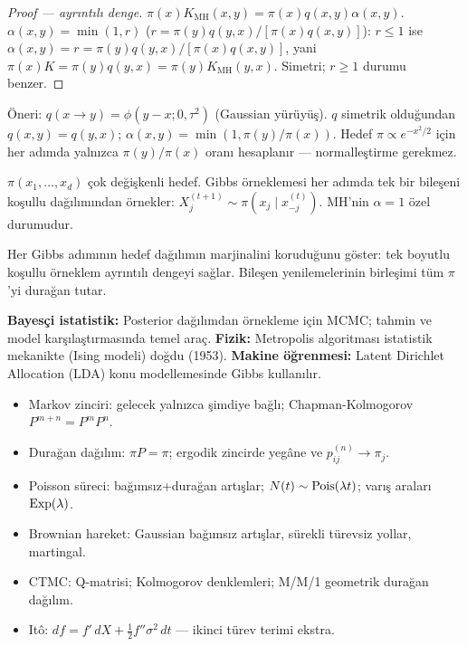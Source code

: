\begin{proof}[Proof --- ayrıntılı denge]
$\pi(x)K_{\mathrm{MH}}(x,y) = \pi(x)q(x,y)\alpha(x,y)$. $\alpha(x,y)=\min(1,r)$ ($r=\pi(y)q(y,x)/[\pi(x)q(x,y)]$): $r\leq1$ ise $\alpha(x,y)=r=\pi(y)q(y,x)/[\pi(x)q(x,y)]$, yani $\pi(x)K=\pi(y)q(y,x)=\pi(y)K_{\mathrm{MH}}(y,x)$. Simetri; $r\geq1$ durumu benzer.
\end{proof}

\begin{ornek}
Öneri: $q(x\to y)=\phi(y-x;0,\tau^2)$ (Gaussian yürüyüş). $q$ simetrik olduğundan $q(x,y)=q(y,x)$; $\alpha(x,y)=\min(1,\pi(y)/\pi(x))$. Hedef $\pi\propto e^{-x^2/2}$ için her adımda yalnızca $\pi(y)/\pi(x)$ oranı hesaplanır --- normalleştirme gerekmez.
\end{ornek}

\begin{teorem}\label{thm:gibbs}
$\pi(x_1,\ldots,x_d)$ çok değişkenli hedef. Gibbs örneklemesi her adımda tek bir bileşeni koşullu dağılımından örnekler: $X_j^{(t+1)}\sim\pi(x_j\mid x_{-j}^{(t)})$. MH'nin $\alpha=1$ özel durumudur.
\end{teorem}

\begin{ispatiskele}
Her Gibbs adımının hedef dağılımın marjinalini koruduğunu göster: tek boyutlu koşullu örneklem ayrıntılı dengeyi sağlar. Bileşen yenilemelerinin birleşimi tüm $\pi$'yi durağan tutar.
\end{ispatiskele}

\begin{disiplinlerarasibaglan}
\textbf{Bayesçi istatistik:} Posterior dağılımdan örnekleme için MCMC; tahmin ve model karşılaştırmasında temel araç. \textbf{Fizik:} Metropolis algoritması istatistik mekanikte (Ising modeli) doğdu (1953). \textbf{Makine öğrenmesi:} Latent Dirichlet Allocation (LDA) konu modellemesinde Gibbs kullanılır.
\end{disiplinlerarasibaglan}


\begin{mikroozet}
\begin{itemize}
  \item Markov zinciri: gelecek yalnızca şimdiye bağlı; Chapman-Kolmogorov $P^{m+n}=P^m P^n$.
  \item Durağan dağılım: $\pi P=\pi$; ergodik zincirde yegâne ve $p_{ij}^{(n)}\to\pi_j$.
  \item Poisson süreci: bağımsız+durağan artışlar; $N(t)\sim\operatorname{Pois}(\lambda t)$; varış araları $\operatorname{Exp}(\lambda)$.
  \item Brownian hareket: Gaussian bağımsız artışlar, sürekli türevsiz yollar, martingal.
  \item CTMC: Q-matrisi; Kolmogorov denklemleri; M/M/1 geometrik durağan dağılım.
  \item Itô: $df = f'\,dX + \frac12 f''\sigma^2\,dt$ --- ikinci türev terimi ekstra.
\end{itemize}
\end{mikroozet}

